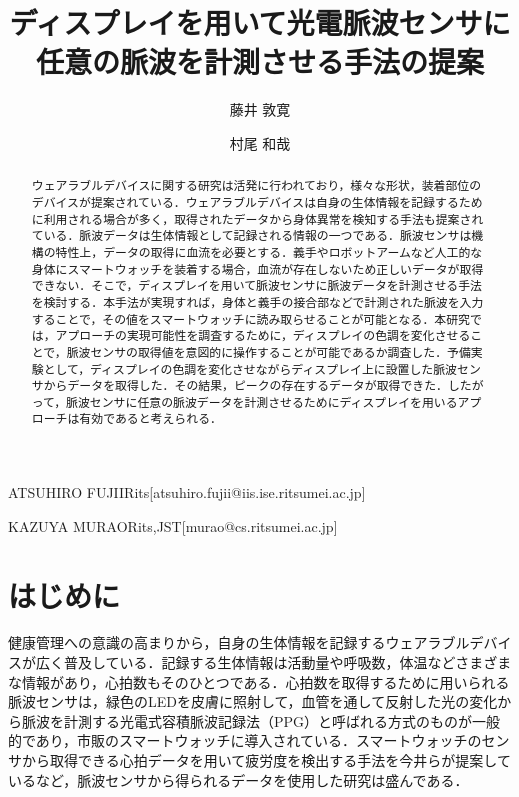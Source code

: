 \documentclass[Japanese,noauthor]{dicomopapers}
\begin{document}
\title{ディスプレイを用いて光電脈波センサに\\任意の脈波を計測させる手法の提案}


\author{藤井 敦寛}{ATSUHIRO FUJII}{Rits}[atsuhiro.fujii@iis.ise.ritsumei.ac.jp]
\author{村尾 和哉}{KAZUYA MURAO}{Rits,JST}[murao@cs.ritsumei.ac.jp]

\begin{abstract}
  ウェアラブルデバイスに関する研究は活発に行われており，様々な形状，装着部位のデバイスが提案されている．ウェアラブルデバイスは自身の生体情報を記録するために利用される場合が多く，取得されたデータから身体異常を検知する手法も提案されている．脈波データは生体情報として記録される情報の一つである．脈波センサは機構の特性上，データの取得に血流を必要とする．義手やロボットアームなど人工的な身体にスマートウォッチを装着する場合，血流が存在しないため正しいデータが取得できない．そこで，ディスプレイを用いて脈波センサに脈波データを計測させる手法を検討する．本手法が実現すれば，身体と義手の接合部などで計測された脈波を入力することで，その値をスマートウォッチに読み取らせることが可能となる．本研究では，アプローチの実現可能性を調査するために，ディスプレイの色調を変化させることで，脈波センサの取得値を意図的に操作することが可能であるか調査した．予備実験として，ディスプレイの色調を変化させながらディスプレイ上に設置した脈波センサからデータを取得した．その結果，ピークの存在するデータが取得できた．したがって，脈波センサに任意の脈波データを計測させるためにディスプレイを用いるアプローチは有効であると考えられる．
\end{abstract}

\maketitle

\section{はじめに}
\label{introduction}
健康管理への意識の高まりから，自身の生体情報を記録するウェアラブルデバイスが広く普及している．記録する生体情報は活動量や呼吸数，体温などさまざまな情報があり，心拍数もそのひとつである．心拍数を取得するために用いられる脈波センサは，緑色のLEDを皮膚に照射して，血管を通して反射した光の変化から脈波を計測する光電式容積脈波記録法（PPG）と呼ばれる方式のものが一般的であり，市販のスマートウォッチに導入されている．スマートウォッチのセンサから取得できる心拍データを用いて疲労度を検出する手法を今井ら\cite{fatigue_detection}が提案しているなど，脈波センサから得られるデータを使用した研究は盛んである．
\end{document}
